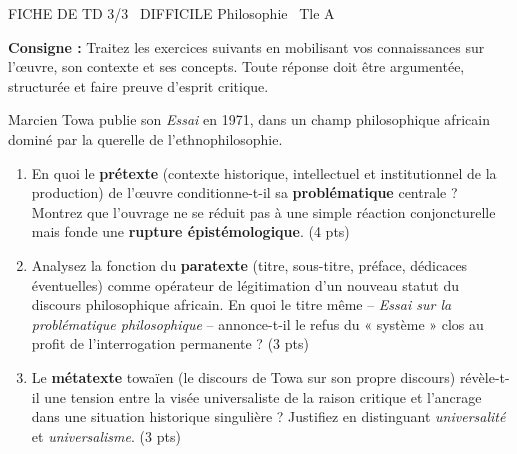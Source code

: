 \documentclass[11pt]{article}
\begin{document}
\begin{tcolorbox}[enhanced,colback=popink,colframe=popink,arc=10pt,boxrule=0pt,left=12pt,right=12pt,top=9pt,bottom=9pt]
{\color{white}\popxbold\small FICHE DE TD 3/3 \textbullet\ DIFFICILE \hfill Philosophie \textbullet\ Tle A\par}
\end{tcolorbox}
\vspace{4pt}
\textbf{Consigne :} Traitez les exercices suivants en mobilisant vos connaissances sur l'œuvre, son contexte et ses concepts. Toute réponse doit être argumentée, structurée et faire preuve d'esprit critique.

\begin{exercice}
Marcien Towa publie son \textit{Essai} en 1971, dans un champ philosophique africain dominé par la querelle de l'ethnophilosophie. 
\begin{enumerate}
    \item En quoi le \textbf{prétexte} (contexte historique, intellectuel et institutionnel de la production) de l'œuvre conditionne-t-il sa \textbf{problématique} centrale ? Montrez que l'ouvrage ne se réduit pas à une simple réaction conjoncturelle mais fonde une \textbf{rupture épistémologique}. (4 pts)
    \item Analysez la fonction du \textbf{paratexte} (titre, sous-titre, préface, dédicaces éventuelles) comme opérateur de légitimation d'un nouveau statut du discours philosophique africain. En quoi le titre même -- \textit{Essai sur la problématique philosophique} -- annonce-t-il le refus du « système » clos au profit de l'interrogation permanente ? (3 pts)
    \item Le \textbf{métatexte} towaïen (le discours de Towa sur son propre discours) révèle-t-il une tension entre la visée universaliste de la raison critique et l'ancrage dans une situation historique singulière ? Justifiez en distinguant \textit{universalité} et \textit{universalisme}. (3 pts)
\end{enumerate}
\end{exercice}
\end{document}
